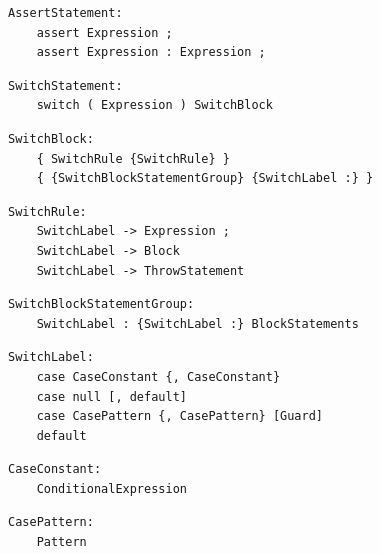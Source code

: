 \noindent\textbf{\texttt{}}\par
\begin{lstlisting}
AssertStatement:
    assert Expression ;
    assert Expression : Expression ;
\end{lstlisting}

\noindent\textbf{\texttt{}}\par
\begin{lstlisting}
SwitchStatement:
    switch ( Expression ) SwitchBlock
\end{lstlisting}

\noindent\textbf{\texttt{}}\par
\begin{lstlisting}
SwitchBlock:
    { SwitchRule {SwitchRule} }
    { {SwitchBlockStatementGroup} {SwitchLabel :} }
\end{lstlisting}

\noindent\textbf{\texttt{}}\par
\begin{lstlisting}
SwitchRule:
    SwitchLabel -> Expression ;
    SwitchLabel -> Block
    SwitchLabel -> ThrowStatement
\end{lstlisting}

\noindent\textbf{\texttt{}}\par
\begin{lstlisting}
SwitchBlockStatementGroup:
    SwitchLabel : {SwitchLabel :} BlockStatements
\end{lstlisting}

\noindent\textbf{\texttt{}}\par
\begin{lstlisting}
SwitchLabel:
    case CaseConstant {, CaseConstant}
    case null [, default]
    case CasePattern {, CasePattern} [Guard]
    default
\end{lstlisting}

\noindent\textbf{\texttt{}}\par
\begin{lstlisting}
CaseConstant:
    ConditionalExpression
\end{lstlisting}

\noindent\textbf{\texttt{}}\par
\begin{lstlisting}
CasePattern:
    Pattern
\end{lstlisting}

